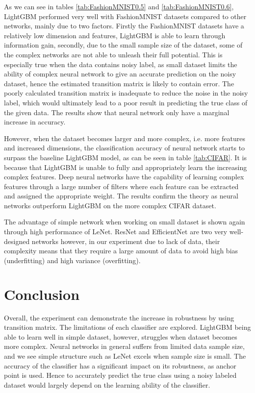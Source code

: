 \documentclass{article} %
\begin{document}
As we can see in tables \ref{tab:FashionMNIST0.5} and \ref{tab:FashionMNIST0.6}, LightGBM performed very well with FashionMNIST datasets compared to other networks, mainly due to two factors. Firstly the FashionMNIST datasets have a relatively low dimension and features, LightGBM is able to learn through information gain, secondly, due to the small sample size of the dataset, some of the complex networks are not able to unleash their full potential. This is especially true when the data contains noisy label, as small dataset limits the ability of complex neural network to give an accurate prediction on the noisy dataset, hence the estimated transition matrix is likely to contain error. The poorly calculated transition matrix is inadequate to reduce the noise in the noisy label, which would ultimately lead to a poor result in predicting the true class of the given data. The results show that neural network only have a marginal increase in accuracy.

However, when the dataset becomes larger and more complex, i.e. more features and increased dimensions, the classification accuracy of neural network starts to surpass the baseline LightGBM model, as can be seen in table \ref{tab:CIFAR}. It is because that LightGBM is unable to fully and appropriately learn the increasing complex features. Deep neural networks have the capability of learning complex features through a large number of filters where each feature can be extracted and assigned the appropriate weight. The results confirm the theory as neural networks outperform LightGBM on the more complex CIFAR dataset.

The advantage of simple network when working on small dataset is shown again through high performance of LeNet. ResNet and EfficientNet are two very well-designed networks however, in our experiment due to lack of data, their complexity means that they require a large amount of data to avoid high bias (underfitting) and high variance (overfitting).


\section{Conclusion}
Overall, the experiment can demonstrate the increase in robustness by using transition matrix. The limitations of each classifier are explored. LightGBM being able to learn well in simple dataset, however, struggles when dataset becomes more complex. Neural networks in general suffers from limited data sample size, and we see simple structure such as LeNet excels when sample size is small. The accuracy of the classifier has a significant impact on its robustness, as anchor point is used. Hence to accurately predict the true class using a noisy labeled dataset would largely depend on the learning ability of the classifier.
\end{document}
